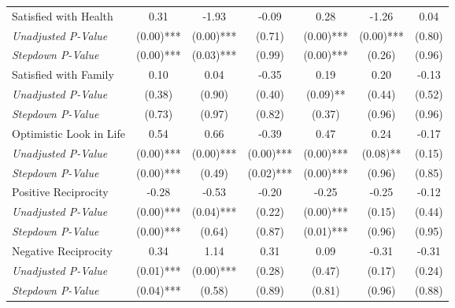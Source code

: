 \begin{tabular}{l c c c c c c}
Satisfied with Health & 0.31 & -1.93 & -0.09 & 0.28 & -1.26 & 0.04 \\
\quad \textit{Unadjusted P-Value} & (0.00)*** & (0.00)*** & (0.71) & (0.00)*** & (0.00)*** & (0.80) \\
\quad \textit{Stepdown P-Value} & (0.00)*** & (0.03)*** & (0.99) & (0.00)*** & (0.26) & (0.96) \\
Satisfied with Family & 0.10 & 0.04 & -0.35 & 0.19 & 0.20 & -0.13 \\
\quad \textit{Unadjusted P-Value} & (0.38) & (0.90) & (0.40) & (0.09)** & (0.44) & (0.52) \\
\quad \textit{Stepdown P-Value} & (0.73) & (0.97) & (0.82) & (0.37) & (0.96) & (0.96) \\
Optimistic Look in Life & 0.54 & 0.66 & -0.39 & 0.47 & 0.24 & -0.17 \\
\quad \textit{Unadjusted P-Value} & (0.00)*** & (0.00)*** & (0.00)*** & (0.00)*** & (0.08)** & (0.15) \\
\quad \textit{Stepdown P-Value} & (0.00)*** & (0.49) & (0.02)*** & (0.00)*** & (0.96) & (0.85) \\
Positive Reciprocity & -0.28 & -0.53 & -0.20 & -0.25 & -0.25 & -0.12 \\
\quad \textit{Unadjusted P-Value} & (0.00)*** & (0.04)*** & (0.22) & (0.00)*** & (0.15) & (0.44) \\
\quad \textit{Stepdown P-Value} & (0.00)*** & (0.64) & (0.87) & (0.01)*** & (0.96) & (0.95) \\
Negative Reciprocity & 0.34 & 1.14 & 0.31 & 0.09 & -0.31 & -0.31 \\
\quad \textit{Unadjusted P-Value} & (0.01)*** & (0.00)*** & (0.28) & (0.47) & (0.17) & (0.24) \\
\quad \textit{Stepdown P-Value} & (0.04)*** & (0.58) & (0.89) & (0.81) & (0.96) & (0.88) \\
\bottomrule
\end{tabular}
